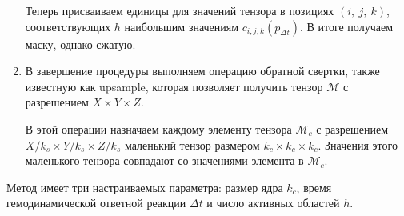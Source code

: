 \begin{enumerate}
	Теперь присваиваем единицы для значений тензора в позициях $(i,~j,~k)$, соответствующих $h$ наибольшим значениям $c_{i,j,k}(p_{\Delta t})$. В итоге получаем маску, однако сжатую.

	\item В завершение процедуры выполняем операцию обратной свертки, также известную как upsample, которая позволяет получить тензор $\mathcal{M}$ с разрешением $X \times Y \times Z$.

    В этой операции назначаем каждому элементу тензора $\mathcal{M}_c$ с разрешением $X/ k_s \times Y/ k_s \times Z/ k_s$ маленький тензор размером $k_c \times k_c \times k_c$. Значения этого маленького тензора совпадают со значениями элемента в $\mathcal{M}_c$.
	
\end{enumerate}
Метод имеет три настраиваемых параметра: размер ядра $k_c$, время гемодинамической ответной реакции 
$\Delta t$ и число активных областей $h$.

